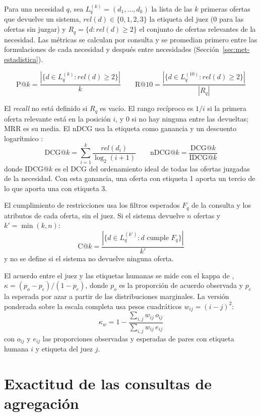 Para una necesidad $q$, sea $L_q^{(k)} = (d_1, \ldots, d_k)$ la lista de las $k$ primeras ofertas que devuelve un sistema, $\mathit{rel}(d) \in \{0, 1, 2, 3\}$ la etiqueta del juez (0 para las ofertas sin juzgar) y $R_q = \{d : \mathit{rel}(d) \geq 2\}$ el conjunto de ofertas relevantes de la necesidad. Las métricas se calculan por consulta y se promedian primero entre las formulaciones de cada necesidad y después entre necesidades (Sección~\ref{sec:met-estadistica}).

\[ \mathrm{P@}k = \frac{|\{d \in L_q^{(k)} : \mathit{rel}(d) \geq 2\}|}{k} \qquad \mathrm{R@}10 = \frac{|\{d \in L_q^{(10)} : \mathit{rel}(d) \geq 2\}|}{|R_q|} \]

El \textit{recall} no está definido si $R_q$ es vacío. El rango recíproco es $1/i$ si la primera oferta relevante está en la posición $i$, y 0 si no hay ninguna entre las devueltas; MRR es su media. El nDCG usa la etiqueta como ganancia y un descuento logarítmico \citep{Jarvelin2002}:
\[ \mathrm{DCG@}k = \sum_{i=1}^{k} \frac{\mathit{rel}(d_i)}{\log_2(i+1)} \qquad \mathrm{nDCG@}k = \frac{\mathrm{DCG@}k}{\mathrm{IDCG@}k} \]
donde $\mathrm{IDCG@}k$ es el DCG del ordenamiento ideal de todas las ofertas juzgadas de la necesidad. Con esta ganancia, una oferta con etiqueta 1 aporta un tercio de lo que aporta una con etiqueta 3.

El cumplimiento de restricciones usa los filtros esperados $F_q$ de la consulta y los atributos de cada oferta, sin el juez. Si el sistema devuelve $n$ ofertas y $k' = \min(k, n)$:
\[ \mathrm{C@}k = \frac{|\{d \in L_q^{(k')} : d \text{ cumple } F_q\}|}{k'} \]
y no se define si el sistema no devuelve ninguna oferta.

El acuerdo entre el juez y las etiquetas humanas se mide con el kappa de \citet{Cohen1960}, $\kappa = (p_o - p_e)/(1 - p_e)$, donde $p_o$ es la proporción de acuerdo observada y $p_e$ la esperada por azar a partir de las distribuciones marginales. La versión ponderada sobre la escala completa usa pesos cuadráticos $w_{ij} = (i - j)^2$:
\[ \kappa_w = 1 - \frac{\sum_{i,j} w_{ij}\, o_{ij}}{\sum_{i,j} w_{ij}\, e_{ij}} \]
con $o_{ij}$ y $e_{ij}$ las proporciones observadas y esperadas de pares con etiqueta humana $i$ y etiqueta del juez $j$.

\section{Exactitud de las consultas de agregación}
\label{anx:agregacion}

